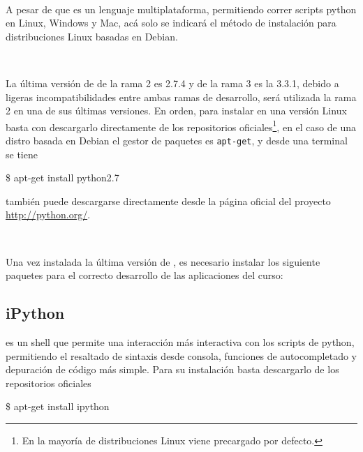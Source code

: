 \

A pesar de que \python es un lenguaje multiplataforma, permitiendo correr 
scripts python en Linux, Windows y Mac, acá solo se indicará el método de 
instalación para distribuciones Linux basadas en Debian.

\

La última versión de \python de la rama 2 es 2.7.4 y de la rama 3 es la 
3.3.1, debido a ligeras incompatibilidades entre ambas ramas de desarrollo, 
será utilizada la rama 2 en una de sus últimas versiones. En orden, para 
instalar \python en una versión Linux basta con descargarlo directamente 
de los repositorios oficiales\footnote{En la mayoría de distribuciones Linux
\python viene precargado por defecto.}, en el caso de una distro basada 
en Debian el gestor de paquetes es \texttt{apt-get}, y desde una terminal 
se tiene


\begin{listing}[style=consola, numbers=none]
\$ apt-get install python2.7
\end{listing}


también puede descargarse directamente desde la página oficial del proyecto 
\url{http://python.org/}.

\

Una vez instalada la última versión de \python, es necesario instalar los
siguiente paquetes para el correcto desarrollo de las aplicaciones del 
curso:


\subsection*{iPython}

\ipython es un shell que permite una interacción más interactiva con los
scripts de python, permitiendo el resaltado de sintaxis desde consola, 
funciones de autocompletado y depuración de código más simple. Para su 
instalación basta descargarlo de los repositorios oficiales 


\begin{listing}[style=consola, numbers=none]
\$ apt-get install ipython
\end{listing}


